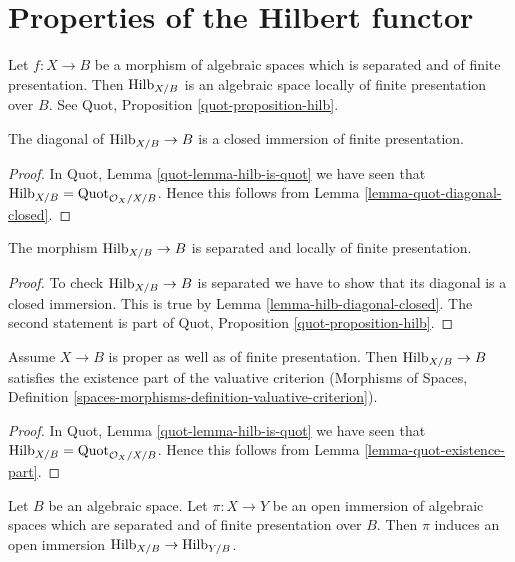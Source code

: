 \section{Properties of the Hilbert functor}
\label{section-hilb}

\noindent
Let $f : X \to B$ be a morphism of algebraic spaces which is
separated and of finite presentation. Then
$\mathrm{Hilb}_{X/B}$ is an algebraic space locally of finite
presentation over $B$. See Quot, Proposition \ref{quot-proposition-hilb}.

\begin{lemma}
\label{lemma-hilb-diagonal-closed}
The diagonal of $\mathrm{Hilb}_{X/B} \to B$ is a closed immersion
of finite presentation.
\end{lemma}

\begin{proof}
In Quot, Lemma \ref{quot-lemma-hilb-is-quot} we have seen that
$\mathrm{Hilb}_{X/B} = \mathrm{Quot}_{\mathcal{O}_X/X/B}$.
Hence this follows from Lemma \ref{lemma-quot-diagonal-closed}.
\end{proof}

\begin{lemma}
\label{lemma-hilb-s-lfp}
The morphism $\mathrm{Hilb}_{X/B} \to B$ is separated
and locally of finite presentation.
\end{lemma}

\begin{proof}
To check $\mathrm{Hilb}_{X/B} \to B$ is separated we have to
show that its diagonal is a closed immersion. This
is true by Lemma \ref{lemma-hilb-diagonal-closed}.
The second statement is part of
Quot, Proposition \ref{quot-proposition-hilb}.
\end{proof}

\begin{lemma}
\label{lemma-hilb-existence-part}
Assume $X \to B$ is proper as well as of finite presentation.
Then $\mathrm{Hilb}_{X/B} \to B$ satisfies the existence part
of the valuative criterion (Morphisms of Spaces, Definition
\ref{spaces-morphisms-definition-valuative-criterion}).
\end{lemma}

\begin{proof}
In Quot, Lemma \ref{quot-lemma-hilb-is-quot} we have seen that
$\mathrm{Hilb}_{X/B} = \mathrm{Quot}_{\mathcal{O}_X/X/B}$.
Hence this follows from Lemma \ref{lemma-quot-existence-part}.
\end{proof}

\begin{lemma}
\label{lemma-hilb-open}
Let $B$ be an algebraic space. Let $\pi : X \to Y$ be an open immersion
of algebraic spaces which are separated and of finite presentation over $B$.
Then $\pi$ induces an open immersion
$\mathrm{Hilb}_{X/B} \to \mathrm{Hilb}_{Y/B}$.
\end{lemma}

